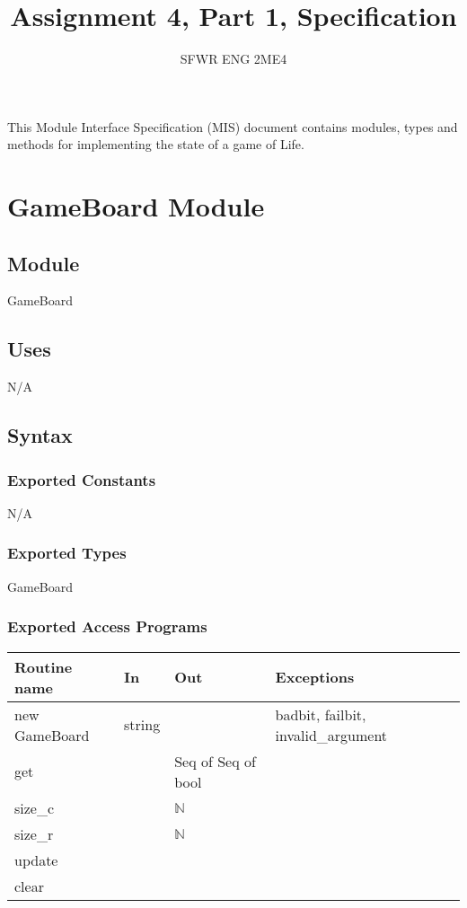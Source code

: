 \documentclass[12pt]{article}
\title{Assignment 4, Part 1, Specification}
\author{SFWR ENG 2ME4}
\begin{document}
\maketitle
This Module Interface Specification (MIS) document contains modules, types and
methods for implementing the state of a game of Life.

\newpage

\section* {GameBoard Module}

\subsection*{Module}

GameBoard

\subsection* {Uses}

N/A

\subsection* {Syntax}

\subsubsection* {Exported Constants}

N/A

\subsubsection* {Exported Types}

GameBoard

\subsubsection* {Exported Access Programs}

\begin{tabular}{| l | l | l | p{5cm} |}
\hline
\textbf{Routine name} & \textbf{In} & \textbf{Out} & \textbf{Exceptions}\\
\hline
new GameBoard & string & & badbit, failbit, invalid\_argument\\
\hline
get &  & Seq of Seq of bool & \\
\hline
size\_c & & $\mathbb{N}$ & \\
\hline
size\_r & & $\mathbb{N}$ & \\
\hline
update& &  & \\
\hline
clear& &  & \\
\hline
\end{tabular}
\end{document}
